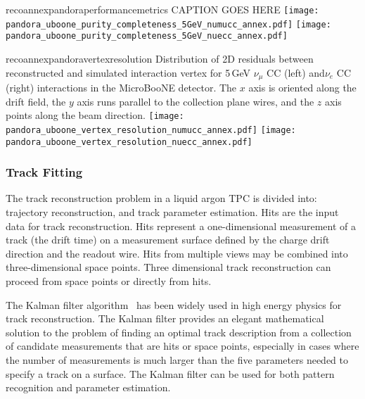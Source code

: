 \begin{cdrfigure}{recoannexpandoraperformancemetrics}
{CAPTION GOES HERE}
\texttt{[image: pandora\_uboone\_purity\_completeness\_5GeV\_numucc\_annex.pdf]}
\texttt{[image: pandora\_uboone\_purity\_completeness\_5GeV\_nuecc\_annex.pdf]}
\end{cdrfigure}

\begin{cdrfigure}{recoannexpandoravertexresolution}
{Distribution of 2D residuals between reconstructed and simulated interaction
 vertex for 5\,GeV $\nu_{\mu}$ CC (left) and$\nu_{e}$ CC (right) interactions in the MicroBooNE detector.
 The $x$ axis is oriented along the drift field, the $y$ axis runs parallel 
 to the collection plane wires, and the $z$ axis points along the beam direction.}
\texttt{[image: pandora\_uboone\_vertex\_resolution\_numucc\_annex.pdf]}
\texttt{[image: pandora\_uboone\_vertex\_resolution\_nuecc\_annex.pdf]}
\end{cdrfigure}


\subsubsection{Track Fitting}


The track reconstruction problem in a liquid argon TPC is divided
into: trajectory reconstruction, and track parameter estimation.
Hits are the input data for track reconstruction. Hits represent a
one-dimensional measurement of a track (the drift time) on a
measurement surface defined by the charge drift direction and the
readout wire. Hits from multiple views may be combined into
three-dimensional space points. Three dimensional track reconstruction
can proceed from space points or directly from hits.

The Kalman filter algorithm~\cite{kalman} has been widely used in high
energy physics for track reconstruction. The Kalman filter provides an
elegant mathematical solution to the problem of finding an optimal
track description from a collection of candidate measurements that are
hits or space points, especially in cases where the number of
measurements is much larger than the five parameters needed to specify
a track on a surface.  The Kalman filter can be used for both pattern
recognition and parameter estimation.

